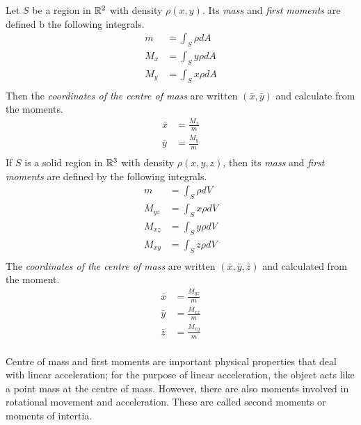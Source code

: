 \documentclass[fleqn,letterpaper]{report}
\begin{document}
\begin{defn}
Let $S$ be a region in $\mathbb{R}^2$ with density $\rho(x,y)$. Its
\emph{mass} and \emph{first moments} are defined b the
following integrals.
\begin{align*}
m & = \int_S \rho dA \\
M_x & = \int_S y \rho dA \\
M_y & = \int_S x \rho dA \\
\end{align*}
Then the \emph{coordinates of the centre of mass} are written
$(\bar{x}, \bar{y})$ and calculate from the moments.
\begin{align*}
\bar{x} & = \frac{M_x}{m} \\
\bar{y} & = \frac{M_y}{m} \\
\end{align*}
If $S$ is a solid region in $\mathbb{R}^3$ with density
$\rho(x,y,z)$, then its \emph{mass} and \emph{first moments}
are defined by the following integrals.
\begin{align*}
m & = \int_S \rho dV \\
M_{yz} & = \int_S x \rho dV \\
M_{xz} & = \int_S y \rho dV \\
M_{xy} & = \int_S z \rho dV \\
\end{align*}
The \emph{coordinates of the centre of mass} are written $(\bar{x},
\bar{y}, \bar{z})$ and calculated from the moment.
\begin{align*}
\bar{x} & = \frac{M_{yz}}{m} \\
\bar{y} & = \frac{M_{xz}}{m} \\
\bar{z} & = \frac{M_{xy}}{m} \\
\end{align*}
\end{defn}
\newpage

Centre of mass and first moments are important physical
properties that deal with linear acceleration; for the purpose
of linear acceleration, the object acts like a point mass at
the centre of mass. However, there are also moments involved
in rotational movement and acceleration. These are called
second moments or moments of intertia. 
\end{document}
